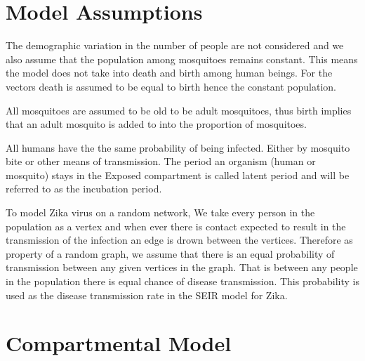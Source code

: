 \section{ Model Assumptions}



The demographic variation in the number of people are not considered  and we also assume that the population among mosquitoes remains constant. This means the model does not take into death and birth among human beings. For the vectors death is assumed to be equal to birth hence the constant population. 

All mosquitoes are assumed to be old to be adult mosquitoes, thus birth implies that an adult mosquito is added to into the proportion of mosquitoes.

All humans have the the same probability of being infected. Either by mosquito bite or other means of  transmission. The period an organism (human or mosquito) stays in the Exposed compartment is called latent period and will be referred to as the incubation period.

To model Zika virus on a random network, We take every person in the population as a vertex and when ever there is contact expected to result in the transmission of the  infection an edge is drown between the vertices. Therefore as property of a random graph, we assume that there is an equal probability of transmission between any given vertices in the graph. That is between any people in the population there is equal chance of disease transmission. This probability is used as the disease transmission rate in the SEIR model for Zika.

\section{Compartmental Model}

